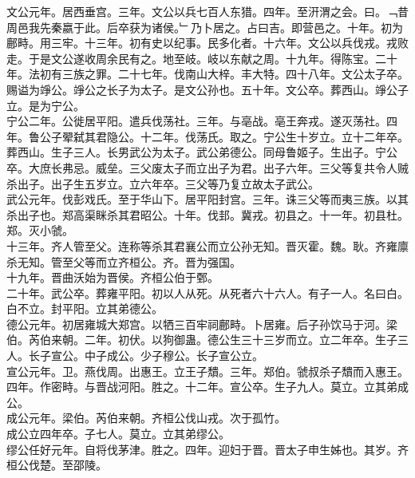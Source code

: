 \documentclass{zhvt-classic}
\begin{document}
\hspace*{2em}文公元年。居西垂宫。三年。文公以兵七百人东猎。四年。至汧渭之会。曰。﹁昔周邑我先秦嬴于此。后卒获为诸侯。﹂乃卜居之。占曰吉。即营邑之。十年。初为鄜畤。用三牢。十三年。初有史以纪事。民多化者。十六年。文公以兵伐戎。戎败走。于是文公遂收周余民有之。地至岐。岐以东献之周。十九年。得陈宝。二十年。法初有三族之罪。二十七年。伐南山大梓。丰大特。四十八年。文公太子卒。赐谥为竫公。竫公之长子为太子。是文公孙也。五十年。文公卒。葬西山。竫公子立。是为宁公。\\
\hspace*{2em}宁公二年。公徙居平阳。遣兵伐荡社。三年。与亳战。亳王奔戎。遂灭荡社。四年。鲁公子翚弑其君隐公。十二年。伐荡氏。取之。宁公生十岁立。立十二年卒。葬西山。生子三人。长男武公为太子。武公弟德公。同母鲁姬子。生出子。宁公卒。大庶长弗忌。威垒。三父废太子而立出子为君。出子六年。三父等复共令人贼杀出子。出子生五岁立。立六年卒。三父等乃复立故太子武公。\\
\hspace*{2em}武公元年。伐彭戏氏。至于华山下。居平阳封宫。三年。诛三父等而夷三族。以其杀出子也。郑高渠眯杀其君昭公。十年。伐邽。冀戎。初县之。十一年。初县杜。郑。灭小虢。\\
\hspace*{2em}十三年。齐人管至父。连称等杀其君襄公而立公孙无知。晋灭霍。魏。耿。齐雍廪杀无知。管至父等而立齐桓公。齐。晋为强国。\\
\hspace*{2em}十九年。晋曲沃始为晋侯。齐桓公伯于鄄。\\
\hspace*{2em}二十年。武公卒。葬雍平阳。初以人从死。从死者六十六人。有子一人。名曰白。白不立。封平阳。立其弟德公。\\
\hspace*{2em}德公元年。初居雍城大郑宫。以牺三百牢祠鄜畤。卜居雍。后子孙饮马于河。梁伯。芮伯来朝。二年。初伏。以狗御蛊。德公生三十三岁而立。立二年卒。生子三人。长子宣公。中子成公。少子穆公。长子宣公立。\\
\hspace*{2em}宣公元年。卫。燕伐周。出惠王。立王子穨。三年。郑伯。虢叔杀子穨而入惠王。四年。作密畤。与晋战河阳。胜之。十二年。宣公卒。生子九人。莫立。立其弟成公。\\
\hspace*{2em}成公元年。梁伯。芮伯来朝。齐桓公伐山戎。次于孤竹。\\
\hspace*{2em}成公立四年卒。子七人。莫立。立其弟缪公。\\
\hspace*{2em}缪公任好元年。自将伐茅津。胜之。四年。迎妇于晋。晋太子申生姊也。其岁。齐桓公伐楚。至邵陵。\\
\end{document}
